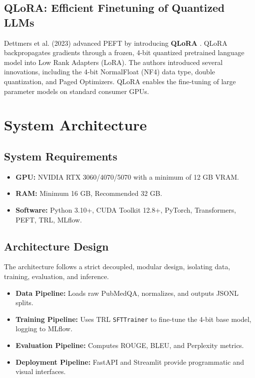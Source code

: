 \documentclass[12pt,a4paper]{report}
\begin{document}
\section{QLoRA: Efficient Finetuning of Quantized LLMs}
Dettmers et al. (2023) advanced PEFT by introducing \textbf{QLoRA} \cite{qlora}. QLoRA backpropagates gradients through a frozen, 4-bit quantized pretrained language model into Low Rank Adapters (LoRA). The authors introduced several innovations, including the 4-bit NormalFloat (NF4) data type, double quantization, and Paged Optimizers. QLoRA enables the fine-tuning of large parameter models on standard consumer GPUs.

\chapter{System Architecture}

\section{System Requirements}
\begin{itemize}
    \item \textbf{GPU:} NVIDIA RTX 3060/4070/5070 with a minimum of 12 GB VRAM.
    \item \textbf{RAM:} Minimum 16 GB, Recommended 32 GB.
    \item \textbf{Software:} Python 3.10+, CUDA Toolkit 12.8+, PyTorch, Transformers, PEFT, TRL, MLflow.
\end{itemize}

\section{Architecture Design}
The architecture follows a strict decoupled, modular design, isolating data, training, evaluation, and inference.

\begin{itemize}
    \item \textbf{Data Pipeline:} Loads raw PubMedQA, normalizes, and outputs JSONL splits.
    \item \textbf{Training Pipeline:} Uses TRL \texttt{SFTTrainer} to fine-tune the 4-bit base model, logging to MLflow.
    \item \textbf{Evaluation Pipeline:} Computes ROUGE, BLEU, and Perplexity metrics.
    \item \textbf{Deployment Pipeline:} FastAPI and Streamlit provide programmatic and visual interfaces.
\end{itemize}
\end{document}
